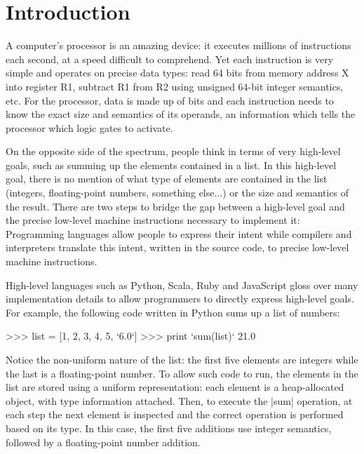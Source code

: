 \chapter{Introduction}

A computer's processor is an amazing device: it executes millions of instructions each second, at a speed difficult to comprehend. Yet each instruction is very simple and operates on precise data types: read 64 bits from memory address X into register R1, subtract R1 from R2 using unsigned 64-bit integer semantics, etc. For the processor, data is made up of bits and each instruction needs to know the exact size and semantics of its operands, an information which tells the processor which logic gates to activate.

On the opposite side of the spectrum, people think in terms of very high-level goals, such as summing up the elements contained in a list. In this high-level goal, there is no mention of what type of elements are contained in the list (integers, floating-point numbers, something else...) or the size and semantics of the result. There are two steps to bridge the gap between a high-level goal and the precise low-level machine instructions necessary to implement it: Programming languages allow people to express their intent while compilers and interpreters translate this intent, written in the source code, to precise low-level machine instructions.

High-level languages such as Python, Scala, Ruby and JavaScript gloss over many implementation details to allow programmers to directly express high-level goals. For example, the following code written in Python sums up a list of numbers:

\begin{lstlisting-nobreak}
 >>> list = [1, 2, 3, 4, 5, `6.0`]
 >>> print `sum(list)`
 21.0
\end{lstlisting-nobreak}

Notice the non-uniform nature of the list: the first five elements are integers while the last is a floating-point number. To allow such code to run, the elements in the list are stored using a uniform representation: each element is a heap-allocated object, with type information attached. Then, to execute the |sum| operation, at each step the next element is inspected and the correct operation is performed based on its type. In this case, the first five additions use integer semantics, followed by a floating-point number addition. %

